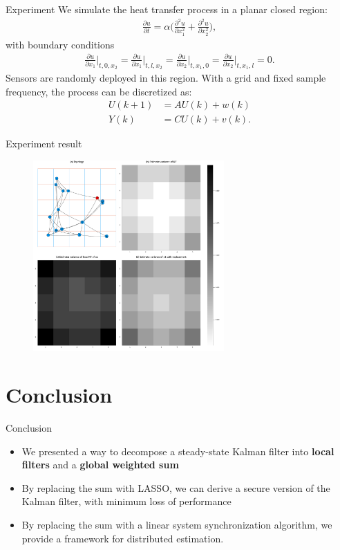 \documentclass[10pt]{beamer}
\DeclareMathOperator{\1}{\textbf{1}}
\begin{document}
\begin{frame}{Experiment}
  We simulate the heat transfer process in a planar closed region:
  \begin{align*}
    \frac{\partial u}{\partial t}=\alpha\Big(\frac{\partial^2u}{\partial x_1^2}+\frac{\partial^2u}{\partial x_2^2}\Big),
  \end{align*}
  with boundary conditions
  \begin{align*}
    \frac{\partial u}{\partial x_1}\Big|_{t,0,x_2}=\frac{\partial u}{\partial x_1}\Big|_{t,l,x_2}=\frac{\partial u}{\partial x_2}\Big|_{t,x_1,0}=\frac{\partial u}{\partial x_2}\Big|_{t,x_1,l}=0.
  \end{align*}
  Sensors are randomly deployed in this region. With a grid and fixed sample frequency, the process can be discretized as:
  \begin{align*}
    U(k+1)&=AU(k)+w(k)\\
    Y(k)&=CU(k)+v(k).
  \end{align*}
\end{frame}

\begin{frame}{Experiment result}
  \begin{figure}[]
    \centering
    \includegraphics[width=0.65\textwidth]{pic/variance.pdf}
  \end{figure}
\end{frame}

\section{Conclusion}

\begin{frame}{Conclusion}
  \begin{itemize}
    \item We presented a way to decompose a steady-state Kalman filter into {\bf local filters} and a {\bf global weighted sum}
    \item By replacing the sum with LASSO, we can derive a secure version of the Kalman filter, with minimum loss of performance
    \item By replacing the sum with a linear system synchronization algorithm, we provide a framework for distributed estimation.
  \end{itemize}
\end{frame}
\end{document}
